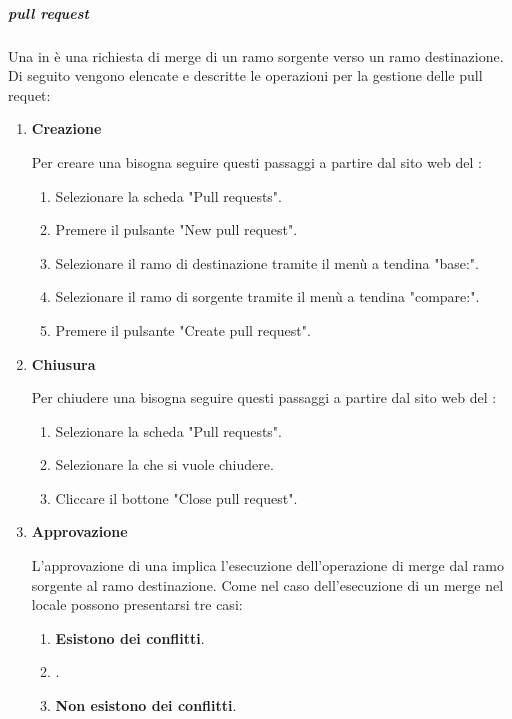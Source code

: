 \subparagraph{pull request}
Una  in  è una richiesta di merge di un ramo sorgente verso un ramo destinazione.
Di seguito vengono elencate e descritte le operazioni per la gestione delle pull requet:
\begin{enumerate}
    \item \textbf{Creazione}\label{item:creazione_pull_request}
    
    Per creare una  bisogna seguire questi passaggi a partire dal sito web del :
    \begin{enumerate}
        \item Selezionare la scheda "Pull requests".
        \item Premere il pulsante "New pull request".
        \item Selezionare il ramo di destinazione tramite il menù a tendina "base:".    
        \item Selezionare il ramo di sorgente tramite il menù a tendina "compare:".
        \item Premere il pulsante "Create pull request".
    \end{enumerate}
    
    \item \textbf{Chiusura}\label{item:chiusura_pull_request}
    
    Per chiudere una  bisogna seguire questi passaggi a partire dal sito web del :
    \begin{enumerate}
        \item Selezionare la scheda "Pull requests".
        \item Selezionare la  che si vuole chiudere.
        \item Cliccare il bottone "Close pull request".
    \end{enumerate}

    \item \textbf{Approvazione} \label{item:approvazione_pull_request}
    
    L'approvazione di una  implica l'esecuzione dell'operazione di merge dal ramo sorgente al ramo destinazione.
    Come nel caso dell'esecuzione di un merge nel  locale possono presentarsi tre casi:

    \begin{enumerate}
        \item \textbf{Esistono dei conflitti}.
        \item \textbf{}.
        \item \textbf{Non esistono dei conflitti}.
    \end{enumerate}


\end{enumerate}
